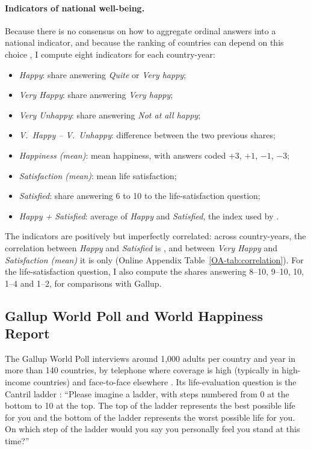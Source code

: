 \documentclass[12pt]{article}
\begin{document}
\paragraph{Indicators of national well-being.}
Because there is no consensus on how to aggregate ordinal answers into a national indicator, and because the ranking of countries can depend on this choice \citep{bond_sad_2019}, I compute eight indicators for each country-year:
\begin{itemize}
    \item \textit{Happy}: share answering \textit{Quite} or \textit{Very happy};
    \item \textit{Very Happy}: share answering \textit{Very happy};
    \item \textit{Very Unhappy}: share answering \textit{Not at all happy};
    \item \textit{V.~Happy -- V.~Unhappy}: difference between the two previous shares;
    \item \textit{Happiness (mean)}: mean happiness, with answers coded $+3$, $+1$, $-1$, $-3$;
    \item \textit{Satisfaction (mean)}: mean life satisfaction;
    \item \textit{Satisfied}: share answering 6 to 10 to the life-satisfaction question;
    \item \textit{Happy + Satisfied}: average of \textit{Happy} and \textit{Satisfied}, the index used by \citet{inglehart_genes_2000}.
\end{itemize}
The indicators are positively but imperfectly correlated: across country-years, the correlation between \textit{Happy} and \textit{Satisfied} is \corHappySatisfied, and between \textit{Very Happy} and \textit{Satisfaction (mean)} it is only \corVeryHappySatisfiedMean (Online Appendix Table~\ref{OA-tab:correlation}). For the life-satisfaction question, I also compute the shares answering 8--10, 9--10, 10, 1--4 and 1--2, for comparisons with Gallup. 

\fi

\subsection{Gallup World Poll and World Happiness Report}\label{subsec:gallup}

The Gallup World Poll interviews around 1,000 adults per country and year in more than 140 countries, by telephone where coverage is high (typically in high-income countries) and face-to-face elsewhere \citep{gallup_methodology_2022}. Its life-evaluation question is the Cantril ladder \citep{cantril_pattern_1965}: ``Please imagine a ladder, with steps numbered from 0 at the bottom to 10 at the top. The top of the ladder represents the best possible life for you and the bottom of the ladder represents the worst possible life for you. On which step of the ladder would you say you personally feel you stand at this time?''
\end{document}
